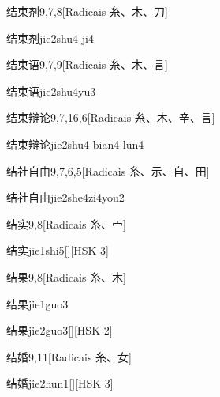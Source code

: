 \begin{entry}{结束剂}{9,7,8}[Radicais ⽷、⽊、⼑]
  \begin{phonetics}{结束剂}{jie2shu4 ji4}
  \end{phonetics}
\end{entry}

\begin{entry}{结束语}{9,7,9}[Radicais ⽷、⽊、⾔]
  \begin{phonetics}{结束语}{jie2shu4yu3}
  \end{phonetics}
\end{entry}

\begin{entry}{结束辩论}{9,7,16,6}[Radicais ⽷、⽊、⾟、⾔]
  \begin{phonetics}{结束辩论}{jie2shu4 bian4 lun4}
  \end{phonetics}
\end{entry}

\begin{entry}{结社自由}{9,7,6,5}[Radicais ⽷、⽰、⾃、⽥]
  \begin{phonetics}{结社自由}{jie2she4zi4you2}
  \end{phonetics}
\end{entry}

\begin{entry}{结实}{9,8}[Radicais ⽷、⼧]
  \begin{phonetics}{结实}{jie1shi5}[][HSK 3]
  \end{phonetics}
\end{entry}

\begin{entry}{结果}{9,8}[Radicais ⽷、⽊]
  \begin{phonetics}{结果}{jie1guo3}
  \end{phonetics}
  \begin{phonetics}{结果}{jie2guo3}[][HSK 2]
  \end{phonetics}
\end{entry}

\begin{entry}{结婚}{9,11}[Radicais ⽷、⼥]
  \begin{phonetics}{结婚}{jie2hun1}[][HSK 3]
  \end{phonetics}
\end{entry}

